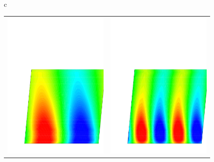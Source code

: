 \begin{figure}
\begin{center}
\begin{tabular}{c}
        {\begin{tabular}{cc}
        \includegraphics[width=70mm,clip=t]{CHAP_RT27/FIGURE/out_pote1.pdf}
        &
        \includegraphics[width=70mm,clip=t]{CHAP_RT27/FIGURE/out_pote2.pdf}
        \end{tabular}}
    \vspace{-2mm}\\
\end{tabular}
\end{center}
\end{figure}
